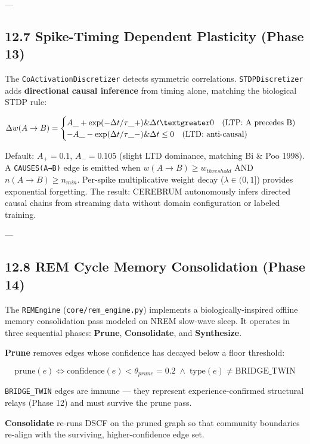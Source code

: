 \documentclass[10pt,journal,compsoc]{IEEEtran}
\begin{document}
---

\subsection{12.7 Spike-Timing Dependent Plasticity (Phase 13)}

The \texttt{CoActivationDiscretizer} detects symmetric corre\-lations. \texttt{STDPDiscretizer} adds \textbf{directional causal inference} from timing alone, matching the biological STDP rule:

$$\Delta w(A \to B) = \begin{cases}
A\_+ \exp(-\Delta t/\tau\_+) \& \Delta t \textgreater  0 \quad \text{(LTP: A precedes B)} \\
-A\_- \exp(\Delta t/\tau\_-) \& \Delta t \leq 0 \quad \text{(LTD: anti-causal)}
\end{cases}$$

Default: $A_+ = 0.1$, $A_- = 0.105$ (slight LTD dominance, matching Bi \& Poo 1998). A \texttt{CAUSES(A→B)} edge is emitted when $w(A \to B) \geq w_{threshold}$ AND $n(A \to B) \geq n_{min}$. Per-spike multi\-plicative weight decay ($\lambda \in (0,1]$) provides exponential forgetting. The result: CEREBRUM auton\-omously infers directed causal chains from streaming data without domain confi\-guration or labeled training.

---

\subsection{12.8 REM Cycle Memory Consol\-idation (Phase 14)}

The \texttt{REMEngine} (\texttt{core/rem\_engine.py}) implements a biolo\-gically-inspired offline memory conso\-lidation pass modeled on NREM slow-wave sleep. It operates in three sequential phases: \textbf{Prune}, \textbf{Consolidate}, and \textbf{Synthesize}.

\textbf{Prune} removes edges whose confidence has decayed below a floor threshold:

\begin{equation}
\text{prune}(e) \iff \text{confidence}(e) < \theta_{prune} = 0.2 \;\wedge\; \text{type}(e) \neq \text{BRIDGE\_TWIN}
\end{equation}

\texttt{BRIDGE\_TWIN} edges are immune — they represent experience-confirmed structural relays (Phase 12) and must survive the prune pass.

\textbf{Consolidate} re-runs DSCF on the pruned graph so that community boundaries re-align with the surviving, higher-confidence edge set.
\end{document}
